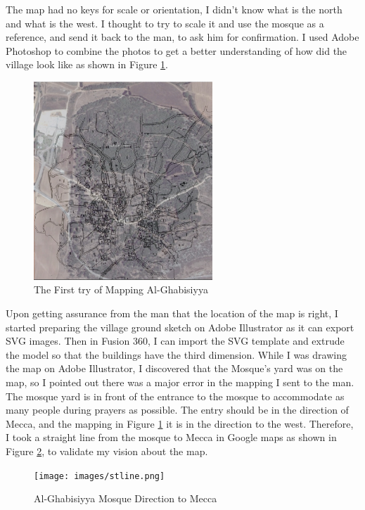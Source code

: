 The map had no keys for scale or orientation, I didn't know what is the north and what is the west. I thought to try to scale it and use the mosque as a reference, and send it back to the man, to ask him for confirmation. I used Adobe Photoshop to combine the photos to get a better understanding of how did the village look like as shown in Figure \ref{fig:wmap}.     

\begin{figure}[ht]
    \centering
    \includegraphics[width=0.60\textwidth]{images/wr_ghb.jpeg}
    \caption{The First try of Mapping Al-Ghabisiyya}
    \label{fig:wmap}
\end{figure} 

Upon getting assurance from the man that the location of the map is right, I started preparing the village ground sketch on Adobe Illustrator as it can export SVG images. Then in Fusion 360, I can import the SVG template and extrude the model so that the buildings have the third dimension. While I was drawing the map on Adobe Illustrator, I discovered that the Mosque's yard was on the map, so I pointed out there was a major error in the mapping I sent to the man. 
The mosque yard is in front of the entrance to the mosque to accommodate as many people during prayers as possible. The entry should be in the direction of Mecca, and the mapping in Figure \ref{fig:wmap} it is in the direction to the west. Therefore, I took a straight line from the mosque to Mecca in Google maps as shown in Figure \ref{fig:stline}, to validate my vision about the map.


\begin{figure}[ht]
    \centering
    \texttt{[image: images/stline.png]}
    \caption{Al-Ghabisiyya Mosque Direction to Mecca}
    \label{fig:stline}
\end{figure} 

